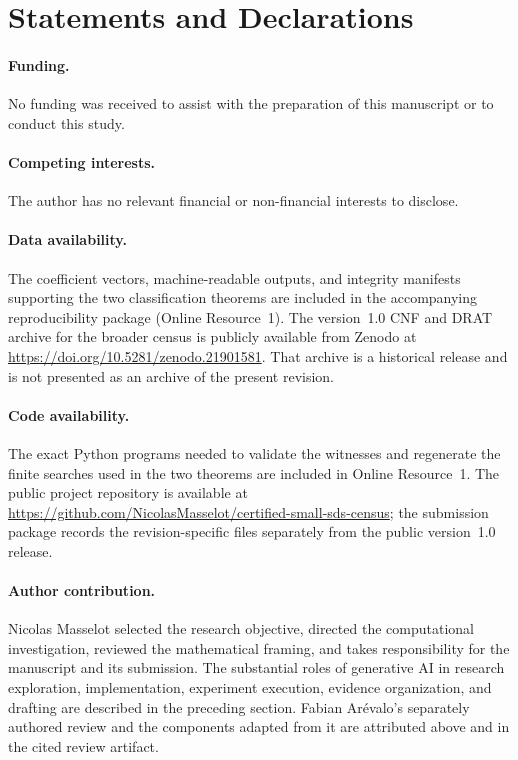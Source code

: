 \documentclass[11pt]{article}
\theoremstyle{remark}
\begin{document}
\section*{Statements and Declarations}

\paragraph{Funding.}
No funding was received to assist with the preparation of this manuscript or
to conduct this study.

\paragraph{Competing interests.}
The author has no relevant financial or non-financial interests to disclose.

\paragraph{Data availability.}
The coefficient vectors, machine-readable outputs, and integrity manifests
supporting the two classification theorems are included in the accompanying
reproducibility package (Online Resource~1).  The version~1.0 CNF and DRAT
archive for the broader census is publicly available from Zenodo at
\url{https://doi.org/10.5281/zenodo.21901581}.  That archive is a historical
release and is not presented as an archive of the present revision.

\paragraph{Code availability.}
The exact Python programs needed to validate the witnesses and regenerate the
finite searches used in the two theorems are included in Online Resource~1.
The public project repository is available at
\url{https://github.com/NicolasMasselot/certified-small-sds-census}; the
submission package records the revision-specific files separately from the
public version~1.0 release.

\paragraph{Author contribution.}
Nicolas Masselot selected the research objective, directed the computational
investigation, reviewed the mathematical framing, and takes responsibility
for the manuscript and its submission.  The substantial roles of generative
AI in research exploration, implementation, experiment execution, evidence
organization, and drafting are described in the preceding section.  Fabian
Ar\'evalo's separately authored review and the components adapted from it are
attributed above and in the cited review artifact.
\end{document}
